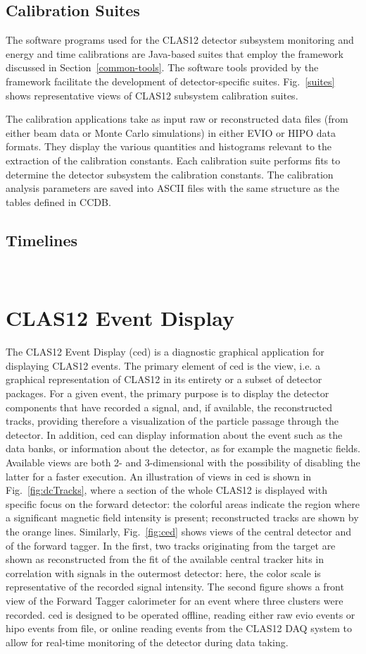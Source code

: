 \subsection{Calibration Suites}

The software programs used for the CLAS12 detector subsystem monitoring and energy and time calibrations are
Java-based suites that employ the framework discussed in Section~\ref{common-tools}.
The software tools provided by the framework facilitate the development of
detector-specific suites. Fig.~\ref{suites} shows representative views of CLAS12 subsystem calibration suites.

The calibration applications take as input raw or reconstructed data files
(from either beam data or Monte Carlo simulations) in
either EVIO or HIPO data formats.  They display the various quantities and histograms relevant to the
extraction of the calibration constants.  Each calibration suite performs fits to determine the detector subsystem
the calibration constants.  The calibration analysis parameters are saved into ASCII files
with the same structure as the tables defined in CCDB.

\subsection{Timelines}
~~

\section{CLAS12 Event Display}
The CLAS12 Event Display (ced) is a diagnostic graphical application for displaying CLAS12 events.
The primary element of ced is the view, i.e. a graphical representation of CLAS12 in its
entirety or a subset of detector packages.  For a given event, the primary purpose is to display the detector components that have recorded a signal, and, if available, the reconstructed tracks, providing therefore a visualization of the particle passage through the detector. In addition, ced can display information about the event such as the data banks, or information about the detector, as for example the magnetic fields. Available views are both 2- and 3-dimensional with the possibility of disabling the latter for a faster execution. An illustration of views in ced is shown in Fig.~\ref{fig:dcTracks}, where a section of the whole CLAS12 is displayed with specific focus on the forward detector: the colorful areas indicate the region where a significant magnetic field intensity is present; reconstructed tracks are shown by the orange lines. Similarly, Fig.~\ref{fig:ced} shows views of the central detector and of the forward tagger. In the first, two tracks originating from the target are shown as reconstructed from the fit of the available central tracker hits in correlation with signals in the outermost detector: here, the color scale is representative of the recorded signal intensity. The second figure shows a front view of the Forward Tagger calorimeter for an event where three clusters were recorded.
ced is designed to be operated offline, reading either raw evio events or hipo events from file, or online reading events from the CLAS12 DAQ system \cite{daq-nim} to allow for real-time monitoring of the detector during data taking.
 
